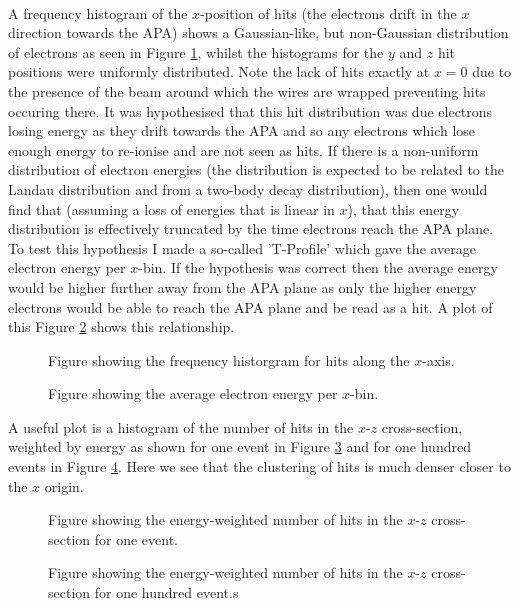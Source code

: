 \documentclass[a4paper,12,oneside,notitlepage]{report}
\begin{document}
\\A frequency histogram of the $x$-position of hits (the electrons drift in the $x$ direction towards the APA) shows a Gaussian-like, but non-Gaussian distribution of electrons as seen in Figure \ref{fig:xHist1}, whilst the histograms for the $y$ and $z$ hit positions were uniformly distributed. Note the lack of hits exactly at $x=0$ due to the presence of the beam around which the wires are wrapped preventing hits occuring there. It was hypothesised that this hit distribution was due electrons losing energy as they drift towards the APA and so any electrons which lose enough energy to re-ionise and are not seen as hits. If there is a non-uniform distribution of electron energies (the distribution is expected to be related to the Landau distribution and from a two-body decay distribution), then one would find that (assuming a loss of energies that is linear in $x$), that this energy distribution is effectively truncated by the time electrons reach the APA plane. To test this hypothesis I made a so-called 'T-Profile' which gave the average electron energy per $x$-bin. If the hypothesis was correct then the average energy would be higher further away from the APA plane as only the higher energy electrons would be able to reach the APA plane and be read as a hit. A plot of this Figure \ref{fig:TProfile1} shows this relationship.
\begin{figure} [H]
\begin{center}
\caption{Figure showing the frequency historgram for hits along the $x$-axis.  \label{fig:xHist1}}
\end{center}
\end{figure}
\begin{figure} [H]
\begin{center}
\caption{Figure showing the average electron energy per $x$-bin. \label{fig:TProfile1}}
\end{center}
\end{figure}
\vspace{0.5cm}
A useful plot is a histogram of the number of hits in the $x$-$z$ cross-section, weighted by energy as shown for one event in Figure \ref{fig:xzCrossSection1event} and for one hundred events in Figure \ref{fig:xzCrossSection100events}. Here we see that the clustering of hits is much denser closer to the $x$ origin. 
\begin{figure} [H]
\begin{center}
\caption{Figure showing the energy-weighted number of hits in the $x$-$z$ cross-section for one event.  \label{fig:xzCrossSection1event}}
\end{center}
\end{figure}
\begin{figure} [H]
\begin{center}
\caption{Figure showing the energy-weighted number of hits in the $x$-$z$ cross-section for one hundred event.s \label{fig:xzCrossSection100events}}
\end{center}
\end{figure}
\end{document}

